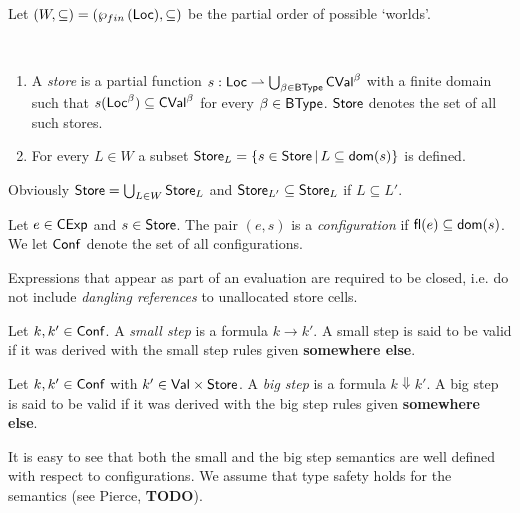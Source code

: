 \documentclass[12pt,a4paper]{report}
\newcommand{\CExp}{\sstyle{CExp}}
\newcommand{\CVal}{\sstyle{CVal}}
\newcommand{\Conf}{\sstyle{Conf}}
\newcommand{\BType}{\sstyle{BType}}
\begin{document}
Let $(W,\subseteq) = (\wp_{fin}\,(\mathsf{Loc}),\subseteq)$ be the partial order of possible `worlds'.

\begin{definition}[Store] \label{definition:Store} \
  \begin{enumerate}
    \item A {\em store} is a partial function $s:\Loc \pto \bigcup_{\beta\in\BType}\CVal^\beta$
      with a finite domain such that $s(\Loc^\beta) \subseteq \CVal^\beta$ for every $\beta\in\BType$.
      $\mathsf{Store}$ denotes the set of all such stores.

    \item For every $L \in W$ a subset $\mathsf{Store}_L = \{s\in\mathsf{Store}\,|\,L\subseteq\mathsf{dom}(s)\}$ is defined.
  \end{enumerate}
\end{definition}

Obviously $\mathsf{Store} = \bigcup_{L\in W} \mathsf{Store}_L$ and $\mathsf{Store}_{L'} \subseteq \mathsf{Store}_L$ if $L \subseteq L'$.

\begin{definition}[Configuration]
  Let $e\in\CExp$ and $s\in\mathsf{Store}$. The pair $(e,s)$ is a {\em configuration}
  if $\mathsf{fl}(e) \subseteq \mathsf{dom}(s)$. We let $\Conf$ denote the set of all configurations.
\end{definition}

Expressions that appear as part of an evaluation are required to be closed, i.e. do not
include {\em dangling references} to unallocated store cells.


\begin{definition}
  Let $k,k'\in\Conf$. A {\em small step} is a formula
  $k \to k'$. A small step is said to be valid if it was derived with
  the small step rules given {\bf somewhere else}.
\end{definition}

\begin{definition}
  Let $k,k'\in\Conf$ with $k' \in \mathsf{Val} \times \mathsf{Store}$. A {\em big step} is a formula
  $k \Downarrow k'$. A big step is said to be valid if it was derived with the
  big step rules given {\bf somewhere else}.
\end{definition}

It is easy to see that both the small and the big step semantics are well defined
with respect to configurations. We assume that type safety holds for the semantics
(see Pierce, {\bf TODO}).
\end{document}
